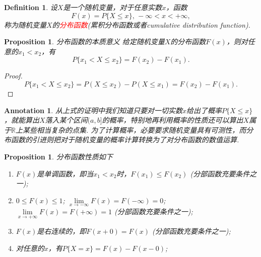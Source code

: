 \documentclass{article}
\newtheorem{proposition}[theorem]{Proposition}
\newtheorem{definition}[theorem]{Definition}
\newtheorem{annotation}[theorem]{Annotation}
\newcommand{\redt}[1]{\textcolor{red}{#1}}
\begin{document}
\begin{definition}
\rm 设$X$是一个随机变量，对于任意实数$x$，函数
$$
F(x) = P\{X \leq x\},\,-\infty < x < +\infty,
$$
称为随机变量$X$的\redt{分布函数}(累积分布函数或者cumulative distribution function). 
\end{definition}

\begin{proposition}
\rm {\color{red} 分布函数的本质意义} 给定随机变量$X$的分布函数$F(x)$，则对任意的$x_1 < x_2$，有
$$
P\{x_1 < X \leq x_2\} = F(x_2) - F(x_1).
$$
\end{proposition}

\begin{proof}
$$
P\{x_1 < X \leq x_2\} = P(X \leq x_2) - P(X \leq x_1) = F(x_2)-F(x_1).
$$
\end{proof}

\begin{annotation}
\rm {\color{blue}从上式的证明中我们知道只要对一切实数$x$给出了概率$P\{X \leq x\}$，就能算出$X$落入某个区间$(a,b]$的概率，特别地再利用概率的性质还可以算出$X$属于$\mathbb{R}$上某些相当复杂的点集}. 为了计算概率，必要要求随机变量具有可测性，而分布函数的引进则把对于随机变量的概率计算转换为了对分布函数的数值运算. 
\end{annotation}

\begin{proposition}
\rm 分布函数性质如下
\begin{enumerate}
	\item $F(x)$是单调函数，即当$x_1 < x_2$时，$F(x_1) \leq F(x_2)$ ({\color{red}分部函数充要条件之一});
	\item $0 \leq F(x) \leq 1$; $\lim\limits_{x \rightarrow -\infty}F(x) =F(-\infty) = 0$; $\lim\limits_{x \rightarrow +\infty}F(x) =F(+\infty)= 1$ ({\color{red}分部函数充要条件之一});
	\item $F(x)$是右连续的，即$F(x+0) = F(x)$ ({\color{red}分部函数充要条件之一}); 
	\item 对任意的$x$，有$P\{X = x\} = F(x) - F(x-0)$;  
\end{enumerate}
\end{proposition}
\end{document}
